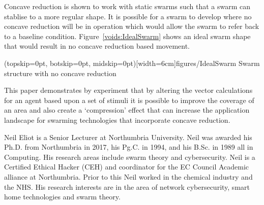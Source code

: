 \documentclass{ieeeaccess}
\begin{document}
Concave reduction is shown to work with static swarms such that a swarm can stablise to a more regular shape. It is possible for a swarm to develop where no concave reduction will be in operation which would allow the swarm to refer back to a baseline condition. Figure~\ref{voids:IdealSwarm} shows an ideal swarm shape that would result in no concave reduction based movement. 

\Figure[t!](topskip=0pt, botskip=0pt, midskip=0pt)[width=6cm]{figures/IdealSwarm}
{Swarm structure with no concave reduction\label{voids:IdealSwarm}}


This paper demonstrates by experiment that by altering the vector calculations for an agent based upon a set of stimuli it is possible to improve the coverage of an area and also create a `compression' effect that can increase the application landscape for swarming technologies that incorporate concave reduction.




\begin{IEEEbiography}{Neil Eliot}
is a Senior Lecturer at Northumbria University.  Neil was awarded his Ph.D. from Northumbria in 2017, his Pg.C. in 1994, and his B.Sc. in 1989 all in Computing. His research areas include swarm theory and cybersecurity. Neil is a Certified Ethical Hacker (CEH) and coordinator for the EC Council Academic alliance at Northumbria. Prior to this Neil worked in the chemical industry and the NHS. His research interests are in the area of network cybersecurity, smart home technologies and swarm theory. 
\end{IEEEbiography}
\end{document}
